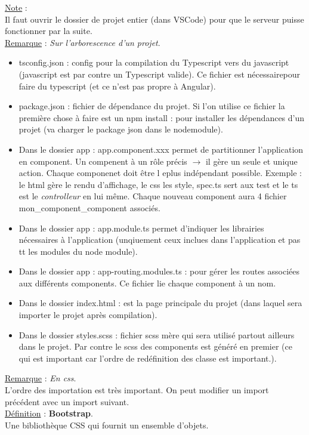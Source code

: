 \documentclass[a4paper,12pt,twoside]{article}
\newcommand{\incode}[1]{{\footnotesize\ttfamily #1}} %
\newcommand{\rem}[2]{\noindent\underline{Remarque} : \textit{#1}.\\ \indent #2}
\newcommand{\note}[1]{\noindent\underline{Note} : \\ \indent #1}
\newcommand{\defi}[2]{\noindent\underline{Définition} : \textbf{#1}.\\ \indent #2}
\begin{document}
\note{Il faut ouvrir le dossier de projet entier (dans VSCode) pour que le serveur puisse fonctionner par la suite.}\\

\rem{Sur l'arborescence d'un projet}{
\begin{itemize}
\item \incode{tsconfig.json} : config pour la compilation du Typescript vers du javascript (javascript est par contre un Typescript valide). Ce fichier est nécessairepour faire du typescript (et ce n'est pas propre à Angular).
\item \incode{package.json} : fichier de dépendance du projet. Si l'on utilise ce fichier la première chose à faire est un \incode{npm install} : pour installer les dépendances d'un projet (va charger le package json dans le nodemodule).
\item Dans le dossier \incode{app} : \incode{app.component.xxx} permet de partitionner l'application en component. Un compenent à un rôle précis $\to$ il gère un seule et unique action. Chaque componenet doit être l eplus indépendant possible. Exemple : le html gère le rendu d'affichage, le css les style, spec.ts sert aux test et le ts est le \textit{controlleur} en lui même. Chaque nouveau component aura 4 fichier mon\_component\_component associés.
\item Dans le dossier \incode{app} : \incode{app.module.ts} permet d'indiquer les librairies nécessaires à l'application (unqiuement ceux inclues dans l'application et pas tt les modules du node module).
\item Dans le dossier \incode{app} : \incode{app-routing.modules.ts} : pour gérer les routes associées aux différents components. Ce fichier lie chaque component à un nom.
\item Dans le dossier \incode{index.html} : est la page principale du projet (dans laquel sera importer le projet après compilation).
\item Dans le dossier \incode{styles.scss} : fichier scss mère qui sera utilisé partout ailleurs dans le projet. Par contre le scss des components est généré en premier (ce qui est important car l'ordre de redéfinition des classe est important.).\\
\end{itemize}
}

\rem{En css}{L'ordre des importation est très important. On peut modifier un import précédent avec un import suivant.}\\

\defi{Bootstrap}{Une bibliothèque CSS qui fournit un ensemble d'objets.}\\
\end{document}
